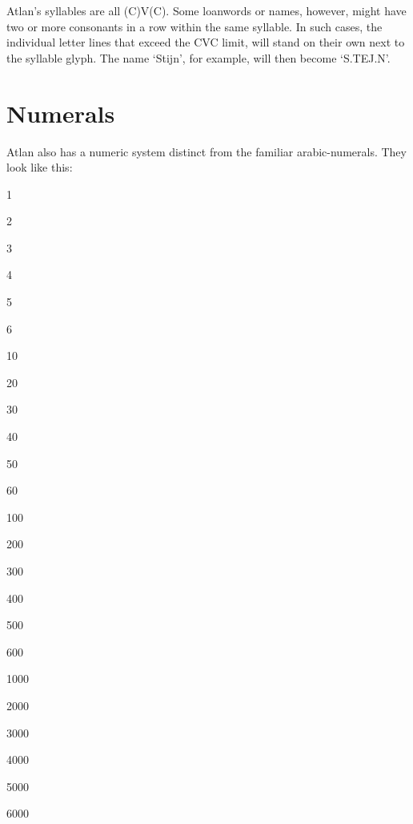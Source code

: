 Atlan’s syllables are all (C)V(C). Some loanwords or names, however, might have two or more consonants in a row within the same syllable. In such cases, the individual letter lines that exceed the CVC limit, will stand on their own next to the syllable glyph. The name ‘Stijn’, for example, will then become ‘S.TEJ.N’. 

\section{Numerals}

Atlan also has a numeric system distinct from the familiar arabic-numerals. They look like this:

\setlength{\columnsep}{10pt}

\begin{multicols}{4}
\small

1    

2   

3   

4   

5   

6   

\columnbreak

10   

20   

30   

40   

50   

60   


\columnbreak

100   

200   

300   

400   

500   

600   


\columnbreak

1000   

2000   

3000   

4000   

5000   

6000   

\end{multicols}
